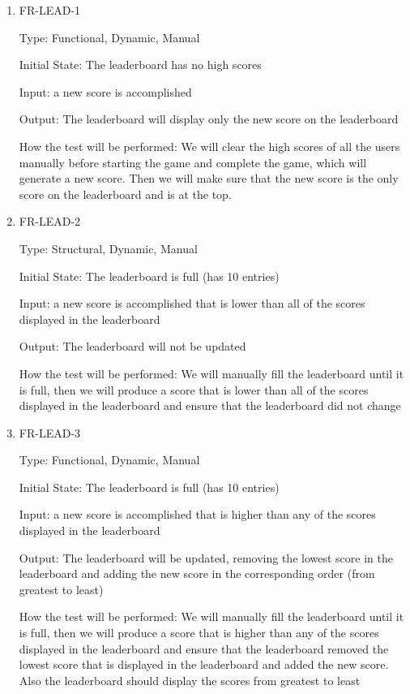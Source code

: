 \documentclass[12pt, titlepage]{article}
\begin{document}
\begin{enumerate}
	\item{FR-LEAD-1\\}
	
	Type: Functional, Dynamic, Manual
	
	Initial State: The leaderboard has no high scores
	
	Input: a new score is accomplished
	
	Output: The leaderboard will display only the new score on the leaderboard
	
	How the test will be performed: We will clear the high scores of all the users manually before starting the game and complete the game, which will generate a new score. Then we will make sure that the new score is the only score on the leaderboard and is at the top.
	
	\item{FR-LEAD-2\\}
	
	Type: Structural, Dynamic, Manual
	
	Initial State: The leaderboard is full (has 10 entries)
	
	Input: a new score is accomplished that is lower than all of the scores displayed in the leaderboard
	
	Output: The leaderboard will not be updated
	
	How the test will be performed: We will manually fill the leaderboard until it is full, then we will produce a score that is lower than all of the scores displayed in the leaderboard and ensure that the leaderboard did not change
	
	\item{FR-LEAD-3\\}
	
	Type: Functional, Dynamic, Manual
	
	Initial State: The leaderboard is full (has 10 entries)
	
	Input: a new score is accomplished that is higher than any of the scores displayed in the leaderboard
	
	Output: The leaderboard will be updated, removing the lowest score in the leaderboard and adding the new score in the corresponding order (from greatest to least)
	
	How the test will be performed: We will manually fill the leaderboard until it is full, then we will produce a score that is higher than any of the scores displayed in the leaderboard and ensure that the leaderboard removed the lowest score that is displayed in the leaderboard and added the new score. Also the leaderboard should display the scores from greatest to least
	

\end{enumerate}
\end{document}
